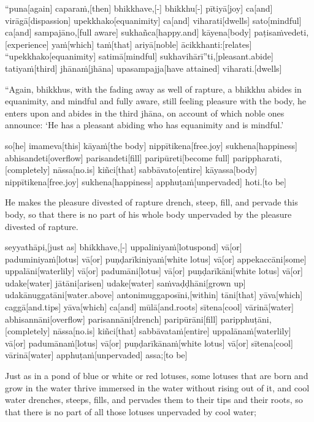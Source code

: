 \vskip 0.05in
\begin{samepage}
\begingl[glneveryline={\PaliGlossA,\PaliGlossB}]
“puna[again] caparaṁ,[then] bhikkhave,[-] bhikkhu[-] pītiyā[joy] ca[and] virāgā[dispassion] upekkhako[equanimity] ca[and] viharati[dwells] sato[mindful] ca[and] sampajāno,[full aware] sukhañca[happy.and] kāyena[body] paṭisaṁvedeti,[experience] yaṁ[which] taṁ[that] ariyā[noble] ācikkhanti:[relates] “upekkhako[equanimity] satimā[mindful] sukhavihārī”ti,[pleasant.abide] tatiyaṁ[third] jhānaṁ[jhāna] upasampajja[have attained] viharati.[dwells]
\endgl
\nopagebreak
\linespread{0.5}
\begin{spacin}{0.2}
{\PaliGlossFT “Again, bhikkhus, with the fading away as well of rapture, a bhikkhu abides in equanimity, and mindful and fully aware, still feeling pleasure with the body, he enters upon and abides in the third jhāna, on account of which noble ones announce: ‘He has a pleasant abiding who has equanimity and is mindful.’}
\end{spacin}
\vskip 12pt
\end{samepage}
\begin{samepage}
\begingl[glneveryline={\PaliGlossA,\PaliGlossB}]
so[he] imameva[this] kāyaṁ[the body] nippītikena[free.joy] sukhena[happiness] abhisandeti[overflow] parisandeti[fill] paripūreti[become full] parippharati,[completely] nāssa[no.is] kiñci[that] sabbāvato[entire] kāyassa[body] nippītikena[free.joy] sukhena[happiness] apphuṭaṁ[unpervaded] hoti.[to be]
\endgl
\nopagebreak
\linespread{0.5}
\begin{spacin}{0.2}
{\PaliGlossFT He makes the pleasure divested of rapture drench, steep, fill, and pervade this body, so that there is no part of his whole body unpervaded by the pleasure divested of rapture.}
\end{spacin}
\vskip 12pt
\end{samepage}
\begin{samepage}
\begingl[glneveryline={\PaliGlossA,\PaliGlossB}]
seyyathāpi,[just as] bhikkhave,[-] uppaliniyaṁ[lotuspond] vā[or] paduminiyaṁ[lotus] vā[or] puṇḍarīkiniyaṁ[white lotus] vā[or] appekaccāni[some] uppalāni[waterlily] vā[or] padumāni[lotus] vā[or] puṇḍarīkāni[white lotus] vā[or] udake[water] jātāni[arisen] udake[water] saṁvaḍḍhāni[grown up] udakānuggatāni[water.above] antonimuggaposīni,[within] tāni[that] yāva[which] caggā[and.tips] yāva[which] ca[and] mūlā[and.roots] sītena[cool] vārinā[water] abhisannāni[overflow] parisannāni[drench] paripūrāni[fill] paripphuṭāni,[completely] nāssa[no.is] kiñci[that] sabbāvataṁ[entire] uppalānaṁ[waterlily] vā[or] padumānaṁ[lotus] vā[or] puṇḍarīkānaṁ[white lotus] vā[or] sītena[cool] vārinā[water] apphuṭaṁ[unpervaded] assa;[to be]
\endgl
\nopagebreak
\linespread{0.5}
\begin{spacin}{0.2}
{\PaliGlossFT Just as in a pond of blue or white or red lotuses, some lotuses that are born and grow in the water thrive immersed in the water without rising out of it, and cool water drenches, steeps, fills, and pervades them to their tips and their roots, so that there is no part of all those lotuses unpervaded by cool water;}
\end{spacin}
\vskip 12pt
\end{samepage}
